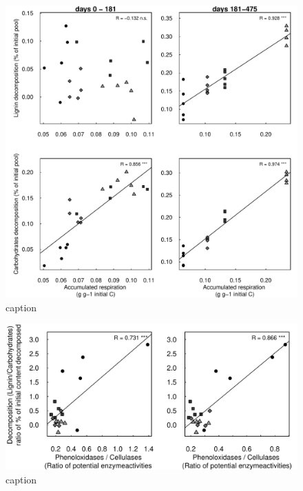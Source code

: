 \documentclass[authoryear,preprint,review,12pt]{elsarticle}
\begin{document}
\newpage
\begin{figure}[h!]
\vspace*{2mm}
\begin{center}
\includegraphics{sbb-respcorr}
\end{center}
\caption{caption}
\label{fig:repcor}
\end{figure}

\newpage
\begin{figure}[h!]
\vspace*{2mm}
\begin{center}
\includegraphics{sbb-enzcorr}
\end{center}
\caption{caption}
\label{fig:enzcor}
\end{figure}
\end{document}

